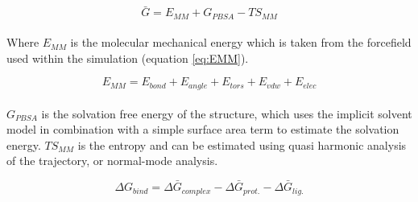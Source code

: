     \begin{equation}\label{eq:G}
        \bar{G} = E_{MM} + G_{PBSA} -TS_{MM}
    \end{equation}

    \paragraph{}
        Where $E_{MM}$ is the molecular mechanical energy which is taken from the forcefield used within the simulation (equation \ref{eq:EMM}).

    \begin{equation}\label{eq:EMM}
        E_{MM} = E_{bond} + E_{angle} + E_{tors} + E_{vdw} + E_{elec}
    \end{equation}

    \paragraph{}
        $G_{PBSA}$ is the solvation free energy of the structure, which uses the implicit solvent model in combination with a simple surface area term to estimate the solvation energy. $TS_{MM}$ is the entropy and can be estimated using quasi harmonic analysis of the trajectory, or normal-mode analysis.
        
    \begin{equation}
        \Delta G_{bind} = \Delta \bar{G}_{complex} - \Delta \bar{G}_{prot.} - \Delta \bar{G}_{lig.}
    \end{equation}